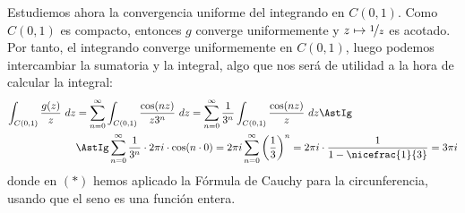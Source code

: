 \documentclass[12pt]{article}
\begin{document}
\begin{ejercicio}[4 puntos]
        Estudiemos ahora la convergencia uniforme del integrando en $C(0,1)$. Como $C(0,1)$ es compacto, entonces $g$ converge uniformemente y $z\mapsto \nicefrac{1}{z}$ es acotado. Por tanto, el integrando converge uniformemente en $C(0,1)$, luego podemos intercambiar la sumatoria y la integral, algo que nos será de utilidad a la hora de calcular la integral:
        \begin{align*}
            \int_{C(0,1)} \frac{g(z)}{z}\ dz &= \sum_{n=0}^{\infty} \int_{C(0,1)} \frac{\cos(nz)}{z3^n}\ dz
            = \sum_{n=0}^{\infty} \frac{1}{3^n}\int_{C(0,1)} \frac{\cos(nz)}{z}\ dz \AstIg\\&\AstIg \sum_{n=0}^{\infty} \frac{1}{3^n}\cdot 2\pi i \cdot \cos (n\cdot 0) = 2\pi i\sum_{n=0}^{\infty} \left(\dfrac{1}{3}\right)^n = 2\pi i \cdot \dfrac{1}{1-\nicefrac{1}{3}} = 3\pi i
        \end{align*}
        donde en $(\ast)$ hemos aplicado la Fórmula de Cauchy para la circunferencia, usando que el seno es una función entera.
    \end{ejercicio}
\end{document}
